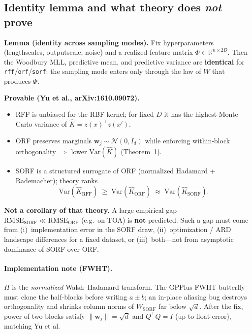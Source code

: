 \documentclass[11pt]{article}
\newcommand{\Ph}{\Phi}
\begin{document}
\subsection{Identity lemma and what theory does \emph{not} prove}
\label{sec:identity-lemma}

\begin{samebox}
\textbf{Lemma (identity across sampling modes).}
Fix hyperparameters (lengthscales, outputscale, noise) and a realized feature matrix $\Ph\in\mathbb{R}^{n\times 2D}$.
Then the Woodbury MLL, predictive mean, and predictive variance are \textbf{identical} for
\texttt{rff}/\texttt{orf}/\texttt{sorf}: the sampling mode enters only through the law of $W$ that produces $\Ph$.
\end{samebox}

\noindent\textbf{Provable (Yu et al., arXiv:1610.09072).}
\begin{itemize}
  \item RFF is unbiased for the RBF kernel; for fixed $D$ it has the highest Monte Carlo variance of $\hat K=z(x)^{\top}z(x')$.
  \item ORF preserves marginals $\mathbf w_j\sim\mathcal N(0,I_d)$ while enforcing within-block orthogonality $\Rightarrow$ lower $\mathrm{Var}(\hat K)$ (Theorem~1).
  \item SORF is a structured surrogate of ORF (normalized Hadamard + Rademacher); theory ranks
  \[
    \mathrm{Var}(\hat K_{\mathrm{RFF}}) \;\ge\; \mathrm{Var}(\hat K_{\mathrm{ORF}})
    \;\approx\; \mathrm{Var}(\hat K_{\mathrm{SORF}}).
  \]
\end{itemize}

\noindent\textbf{Not a corollary of that theory.}
A large empirical gap $\mathrm{RMSE}_{\mathrm{SORF}}\ll\mathrm{RMSE}_{\mathrm{ORF}}$ (e.g.\ on TOA) is \textbf{not} predicted.
Such a gap must come from (i)~implementation error in the SORF draw, (ii)~optimization / ARD landscape differences for a fixed dataset, or (iii)~both---not from asymptotic dominance of SORF over ORF.

\paragraph{Implementation note (FWHT).}
$H$ is the \emph{normalized} Walsh--Hadamard transform.
The GPPlus FWHT butterfly must clone the half-blocks before writing $a\pm b$; an in-place aliasing bug
destroys orthogonality and shrinks column norms of $W_{\mathrm{SORF}}$ far below $\sqrt{d}$.
After the fix, power-of-two blocks satisfy $\|\mathbf w_j\|=\sqrt{d}$ and $Q^{\top}Q=I$ (up to float error), matching Yu et al.
\end{document}
